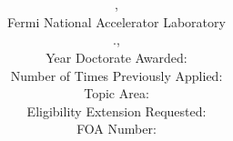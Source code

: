 

\title{\color{NALblue} \bf{\Title}}
\author{\Name, \JobTitle
\\ Fermi National Accelerator Laboratory
\\ \PhoneFirst.\PhoneLast, \EmailFirst\EmailLast
\\Year Doctorate Awarded: \YearPhD
\\Number of Times Previously Applied: \NumPrev
\\ Topic Area: \TopicArea
\\Eligibility Extension Requested: \ExtensionReq
\\FOA Number:  \FOANumber}
